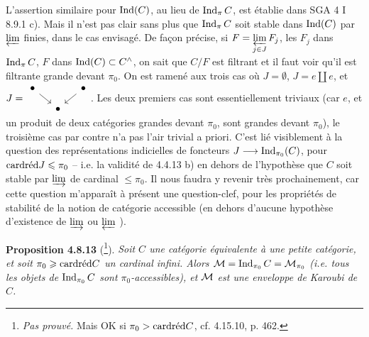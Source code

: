 L'assertion similaire pour $\Ind(C)$, au lieu de $\Ind_{\pi}C$, est établie dans SGA 4 I 8.9.1 c). Mais il n'est pas clair sans plus que $\Ind_{\pi}C$ soit stable dans $\Ind(C)$ par $\varprojlim$ finies, dans le cas envisagé. De façon précise, si $F = \varprojlim\limits_{j\in J} F_j$, les $F_j$ dans $\Ind_{\pi}C$,
$F$ dans $\Ind(C) \subset C^{\wedge}$, on sait que $C/F$ est filtrant et il faut voir qu'il est filtrante grande devant $\pi_0$. On est ramené aux trois cas où $J = \emptyset$, $J = e \amalg e$, et $J = \vcenter{\hbox{\begin{tikzcd}[ampersand replacement=\&, column sep=small, row sep=small]
\bullet \arrow[dr] \& \& \bullet \arrow[dl] \\
\& \bullet \&
\end{tikzcd}}}$. Les deux premiers cas sont essentiellement triviaux (car $e$, et un produit de deux catégories grandes devant $\pi_0$, sont grandes devant $\pi_0$), le troisième cas par contre n'a pas l'air trivial a priori. C'est lié visiblement à la question des représentations indicielles de foncteurs $J \longrightarrow \Ind_{\pi_0}(C)$, pour $\card\red J \leqslant \pi_0$ -- i.e. la validité de 4.4.13 b) en dehors de l'hypothèse que $C$ soit stable par $\varinjlim$ de cardinal $\leqslant \pi_0$. Il nous faudra y revenir très prochainement, car cette question m'apparaît à présent une question-clef, pour les propriétés de stabilité de la notion de catégorie accessible (en dehors d'aucune hypothèse d'existence de $\varinjlim$ ou $\varprojlim$ ). %

\textbf{Proposition 4.8.13} (\footnote[89]{\textit{Pas prouvé.} Mais OK si $\pi_0 > \card\red C$, cf. 4.15.10, p. 462.}). \textit{Soit $C$ une catégorie équivalente à une petite catégorie, et soit $\pi_0 \geqslant \card\red C$ un cardinal infini. Alors $\cM = \Ind_{\pi_0}C = \cM_{\pi_0}$ (i.e. tous les objets de $\Ind_{\pi_0}C$ sont $\pi_0$-accessibles), et $\cM$ est une enveloppe de Karoubi de $C$.}


